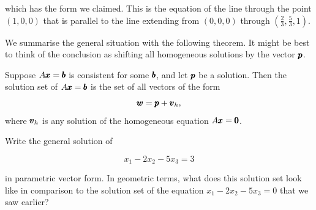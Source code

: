 \begin{example}
which has the form we claimed. This is the equation of the line through the point \((1,0,0)\) that is parallel to the line extending from \((0,0,0)\) through \(\left(\frac{2}{3}, \frac{5}{3}, 1\right)\).

\end{example}

We summarise the general situation with the following theorem. It might be best to think of the conclusion as shifting all homogeneous solutions by the vector $\pmb{p}$.

\begin{theorem}
    Suppose $A \pmb{x} = \pmb{b}$ is consistent for some $\pmb{b}$, and let $\pmb{p}$ be a solution. Then the solution set of $A \pmb{x} = \pmb{b}$ is the set of all vectors of the form
    \[
    \pmb{w} = \pmb{p} + \pmb{v}_h,
    \]
    where $\pmb{v}_h$ is any solution of the homogeneous equation $A \pmb{x} = \pmb{0}$.
\end{theorem}

\begin{example} Write the general solution of

\[
x_1-2 x_2-5 x_3=3
\]

in parametric vector form. In geometric terms, what does this solution set look like in comparison to the solution set of the equation $x_1-2 x_2-5 x_3=0$ that we saw earlier?
\end{example}

